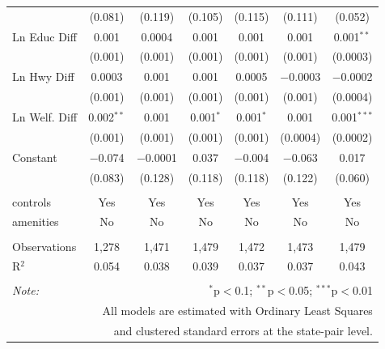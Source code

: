 \begin{table}[!htbp]
\begin{tabular}{@{\extracolsep{5pt}}lcccccc}
  & (0.081) & (0.119) & (0.105) & (0.115) & (0.111) & (0.052) \\ 
  Ln Educ Diff & 0.001 & 0.0004 & 0.001 & 0.001 & 0.001 & 0.001$^{**}$ \\ 
  & (0.001) & (0.001) & (0.001) & (0.001) & (0.001) & (0.0003) \\ 
  Ln Hwy Diff & 0.0003 & 0.001 & 0.001 & 0.0005 & $-$0.0003 & $-$0.0002 \\ 
  & (0.001) & (0.001) & (0.001) & (0.001) & (0.001) & (0.0004) \\ 
  Ln Welf. Diff & 0.002$^{**}$ & 0.001 & 0.001$^{*}$ & 0.001$^{*}$ & 0.001 & 0.001$^{***}$ \\ 
  & (0.001) & (0.001) & (0.001) & (0.001) & (0.0004) & (0.0002) \\ 
  Constant & $-$0.074 & $-$0.0001 & 0.037 & $-$0.004 & $-$0.063 & 0.017 \\ 
  & (0.083) & (0.128) & (0.118) & (0.118) & (0.122) & (0.060) \\ 
 \hline \\[-1.8ex] 
controls & Yes & Yes & Yes & Yes & Yes & Yes \\ 
amenities & No & No & No & No & No & No \\ 
\hline \\[-1.8ex] 
Observations & 1,278 & 1,471 & 1,479 & 1,472 & 1,473 & 1,479 \\ 
R$^{2}$ & 0.054 & 0.038 & 0.039 & 0.037 & 0.037 & 0.043 \\ 
\hline 
\hline \\[-1.8ex] 
\textit{Note:}  & \multicolumn{6}{r}{$^{*}$p$<$0.1; $^{**}$p$<$0.05; $^{***}$p$<$0.01} \\ 
 & \multicolumn{6}{r}{All models are estimated with Ordinary Least Squares} \\ 
 & \multicolumn{6}{r}{and clustered standard errors at the state-pair level.} \\ 
\end{tabular} 
\end{table} 
